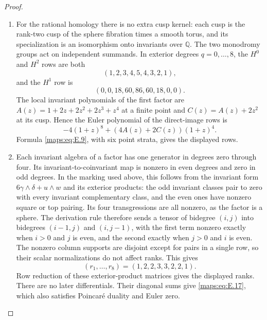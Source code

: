 \begin{proof}
\begin{enumerate}[label=\arabic*.,leftmargin=*]
\item For the rational homology there is no extra cusp kernel: each
cusp is the rank-two cusp of the sphere fibration times a smooth torus, and its
specialization is an isomorphism onto invariants over $\mathbb Q$.
The two monodromy groups act on independent summands.  In exterior
degrees $q=0,\ldots,8$, the $H^0$ and $H^2$ rows are both
\[
 (1,2,3,4,5,4,3,2,1),
\]
and the $H^1$ row is
\[
 (0,0,18,60,86,60,18,0,0).
\]
The local invariant polynomials of the first factor are
$A(z)=1+2z+2z^2+2z^3+z^4$ at a finite point and
$C(z)=A(z)+2z^2$ at its cusp.  Hence the Euler polynomial of
the direct-image rows is
\[
 -4(1+z)^8+(4A(z)+2C(z))(1+z)^4.
\]
Formula \eqref{maps:eq:E.9}, with six point strata, gives the displayed rows.

\item Each invariant algebra of a factor has one generator in degrees
zero through four.  Its invariant-to-coinvariant map is nonzero
in even degrees and zero in odd degrees.  In the marking used
above, this follows from the invariant form
$6\gamma\wedge\delta+u\wedge w$ and its exterior products:
the odd invariant classes pair to zero with every invariant
complementary class, and the even ones have nonzero square or
top pairing.  Its four transgressions are all nonzero, as the
factor is a sphere.  The derivation rule therefore sends a tensor
of bidegree $(i,j)$ into bidegrees $(i-1,j)$ and $(i,j-1)$,
with the first term nonzero exactly when $i>0$ and $j$ is even,
and the second exactly when $j>0$ and $i$ is even.  The nonzero
column supports are disjoint except for pairs in a single row,
so their scalar normalizations do not affect ranks.  This gives
\[
 (r_1,\ldots,r_8)=(1,2,2,3,3,2,2,1).
\]
Row reduction of these exterior-product matrices gives the displayed ranks.
There are no later differentials.  Their diagonal sums give
\eqref{maps:eq:E.17}, which also satisfies Poincar\'e duality and Euler zero.

\end{enumerate}
\end{proof}